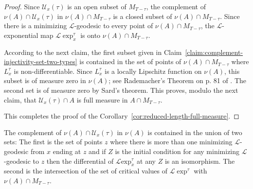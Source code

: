 \begin{proof}

\sketch
Since ${\mathcal U}_x(\tau)$ is an open subset of $M_{T-\tau}$, the complement
of $\nu(A)\cap{\mathcal U}_x(\tau)$ in $\nu(A)\cap M_{T-\tau}$ is a closed
subset of $\nu(A)\cap M_{T-\tau}$. Since there is a minimizing ${\mathcal
L}$-geodesic to every point of $\nu(A)\cap M_{T-\tau}$, the ${\mathcal
L}$-exponential map ${\mathcal L}\exp^\tau_x$ is onto $\nu(A)\cap
M_{T-\tau}$.



 According to the next claim, the first subset given in Claim~\ref{claim:complement-injectivity-set-two-types} is contained in the
set of points of $\nu(A)\cap M_{T-\tau}$ where $L_x^\tau$ is
non-differentiable. Since $L_x^\tau$ is a locally Lipschitz function on
$\nu(A)$, this subset is of measure zero in $\nu(A)$; see Rademacher's Theorem
on p. 81 of \cite{EvansGariepy}. The second set is of measure zero by Sard's
theorem. This proves, modulo the next claim, that ${\mathcal U}_x(\tau)\cap A$
is full measure in $A\cap M_{T-\tau}$.




This completes the proof of the Corollary~\ref{cor:reduced-length-full-measure}.
\end{proof}

\begin{claim}\label{claim:complement-injectivity-set-two-types}
\label{twosets}

The complement of $\nu(A)\cap {\mathcal U}_{x}(\tau)$
in $\nu(A)$ is contained in the union of two sets: The first is the set of
points $z$ where there is more than one minimizing ${\mathcal L}$-geodesic from
$x$ ending at $z$ and if $Z$ is the initial condition for any minimizing
${\mathcal L}$-geodesic to $z$ then the differential of ${\mathcal L}\mathrm{exp}_x^\tau$ at any $Z$ is an isomorphism. The second is the intersection of
the set of critical values of ${\mathcal L}\exp^\tau$ with $\nu(A)\cap
M_{T-\tau}$.
\end{claim}


